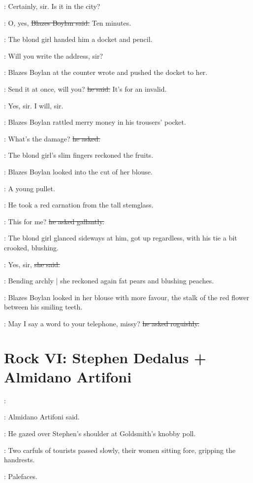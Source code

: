 \blondgirl:
Certainly, sir.
Is it in the city?

\boylan:
O, yes,
\sout{Blazes Boylan said.}
Ten minutes.

:
The blond girl handed him a docket and pencil.

\blondgirl:
Will you write the address,%
sir?

:
Blazes Boylan at the counter wrote
and pushed the docket to her.

\boylan:
Send it at once, will you?
\sout{he said.}
It's for an invalid.

\blondgirl:
Yes, sir. I will, sir.

:
Blazes Boylan rattled merry money in his trousers' pocket.

\boylan:
What's the damage?
\sout{he asked.}

:
The blond girl's slim fingers reckoned the fruits.

:
Blazes Boylan looked into the cut of her blouse.

\boylanint:
A young pullet.

:
He took a red carnation from the tall stemglass.

\boylan:
This for me?
\sout{he asked gallantly.}

:
The blond girl glanced sideways at him,%
got up regardless,
with his tie a bit crooked,
blushing.

\blondgirl:
Yes, sir,
\sout{she said.}

:
Bending archly |
she reckoned again fat pears and blushing peaches.

:
Blazes Boylan looked in her blouse with more favour,
the stalk of the red flower between his smiling teeth.

\boylan:
May I say a word to your telephone, missy?
\sout{he asked roguishly.}


\section*{Rock VI: Stephen Dedalus + Almidano Artifoni}


\artifoni:

:
Almidano Artifoni said.

:
He gazed over Stephen's shoulder at Goldsmith's knobby poll.

:
Two carfuls of tourists passed slowly,%
their women sitting fore,
gripping the handrests.

\StephenInt:
Palefaces.


